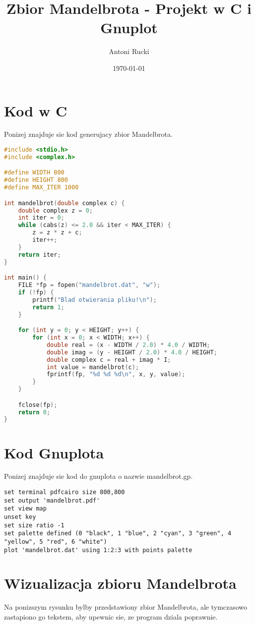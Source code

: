 \documentclass{article}
\title{Zbior Mandelbrota - Projekt w C i Gnuplot}
\author{Antoni Rucki}
\date{\today}
\begin{document}
\maketitle
\tableofcontents
\newpage
\section{Kod w C}
Ponizej znajduje sie kod generujacy zbior Mandelbrota.

\begin{lstlisting}[language=C, caption=Kod programu Mandelbrota]
#include <stdio.h>
#include <complex.h>

#define WIDTH 800
#define HEIGHT 800
#define MAX_ITER 1000

int mandelbrot(double complex c) {
    double complex z = 0;
    int iter = 0;
    while (cabs(z) <= 2.0 && iter < MAX_ITER) {
        z = z * z + c;
        iter++;
    }
    return iter;
}

int main() {
    FILE *fp = fopen("mandelbrot.dat", "w");
    if (!fp) {
        printf("Blad otwierania pliku!\n");
        return 1;
    }

    for (int y = 0; y < HEIGHT; y++) {
        for (int x = 0; x < WIDTH; x++) {
            double real = (x - WIDTH / 2.0) * 4.0 / WIDTH;
            double imag = (y - HEIGHT / 2.0) * 4.0 / HEIGHT;
            double complex c = real + imag * I;
            int value = mandelbrot(c);
            fprintf(fp, "%d %d %d\n", x, y, value);
        }
    }

    fclose(fp);
    return 0;
}
\end{lstlisting}

\newpage
\section{Kod Gnuplota}
Ponizej znajduje sie kod do gnuplota o nazwie mandelbrot.gp.
\begin{lstlisting}[language=Gnuplot, caption=Kod Gnuplota]
set terminal pdfcairo size 800,800
set output 'mandelbrot.pdf'
set view map
unset key
set size ratio -1
set palette defined (0 "black", 1 "blue", 2 "cyan", 3 "green", 4 "yellow", 5 "red", 6 "white")
plot 'mandelbrot.dat' using 1:2:3 with points palette
\end{lstlisting}

\newpage
\section{Wizualizacja zbioru Mandelbrota}
% 

\noindent Na ponizszym rysunku bylby przedstawiony zbior Mandelbrota, ale tymczasowo zastapiono go tekstem, aby upewnic sie, ze program dziala poprawnie.
\end{document}
